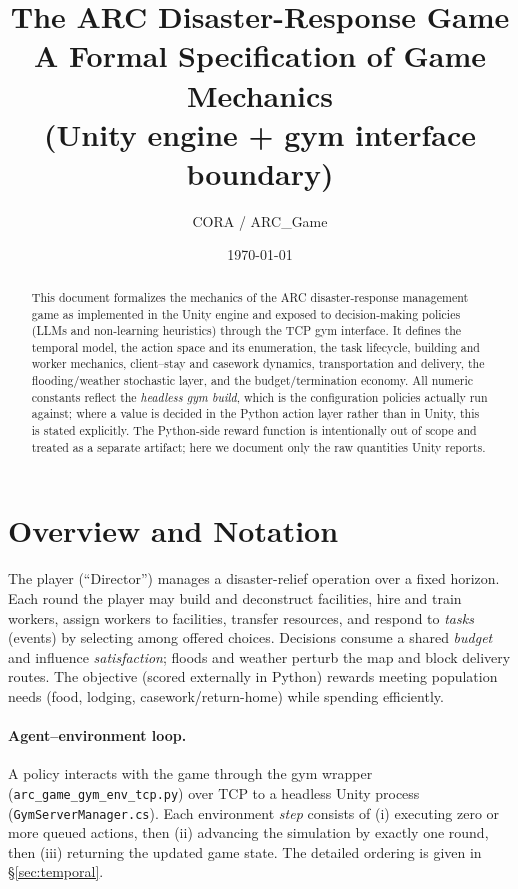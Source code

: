 \documentclass[11pt]{article}
\title{\textbf{The ARC Disaster-Response Game}\\[2pt]
\large A Formal Specification of Game Mechanics\\[4pt]
\normalsize (Unity engine + gym interface boundary)}
\author{CORA / ARC\_Game}
\date{\today}
\newcommand{\file}[1]{\textcolor{blue!40!black}{\texttt{\footnotesize #1}}}
\begin{document}
\maketitle

\begin{abstract}
This document formalizes the mechanics of the ARC disaster-response management
game as implemented in the Unity engine and exposed to decision-making policies
(LLMs and non-learning heuristics) through the TCP gym interface. It defines the
temporal model, the action space and its enumeration, the task lifecycle,
building and worker mechanics, client--stay and casework dynamics, transportation
and delivery, the flooding/weather stochastic layer, and the budget/termination
economy. All numeric constants reflect the \emph{headless gym build}, which is
the configuration policies actually run against; where a value is decided in the
Python action layer rather than in Unity, this is stated explicitly. The
Python-side reward function is intentionally out of scope and treated as a
separate artifact; here we document only the raw quantities Unity reports.
\end{abstract}

\tableofcontents
\bigskip

\section{Overview and Notation}

The player (``Director'') manages a disaster-relief operation over a fixed
horizon. Each round the player may build and deconstruct facilities, hire and
train workers, assign workers to facilities, transfer resources, and respond to
\emph{tasks} (events) by selecting among offered choices. Decisions consume a
shared \emph{budget} and influence \emph{satisfaction}; floods and weather
perturb the map and block delivery routes. The objective (scored externally in
Python) rewards meeting population needs (food, lodging, casework/return-home)
while spending efficiently.

\paragraph{Agent--environment loop.}
A policy interacts with the game through the gym wrapper
(\file{arc\_game\_gym\_env\_tcp.py}) over TCP to a headless Unity process
(\file{GymServerManager.cs}). Each environment \emph{step} consists of (i)
executing zero or more queued actions, then (ii) advancing the simulation by
exactly one round, then (iii) returning the updated game state. The detailed
ordering is given in \S\ref{sec:temporal}.
\end{document}
